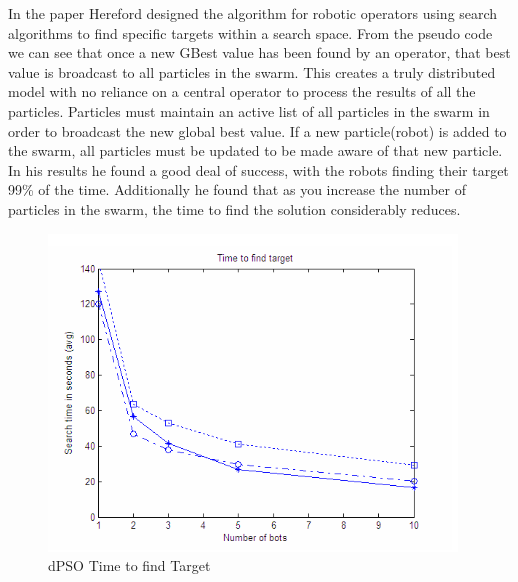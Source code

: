 \documentclass[oneside,12pt]{book}
\begin{document}
In the paper Hereford designed the algorithm for robotic operators using search algorithms to find specific targets within a search space. From the pseudo code we can see that once a new GBest value has been found by an operator, that best value is broadcast to all particles in the swarm. 
This creates a truly distributed model with no reliance on a central operator to process the results of all the particles. Particles must maintain an active list of all particles in the swarm in order to broadcast the new global best value. If a new particle(robot) is added to the swarm, all particles must be updated to be made aware of that new particle. 
In his results he found a good deal of success, with the robots finding their target 99\% of the time. Additionally he found that as you increase the number of particles in the swarm, the time to find the solution considerably reduces. 
\begin{figure}[H]
    \centering
    \includegraphics[scale=0.9]{Images/HerefordResults.png}
    \caption{dPSO Time to find Target \protect\cite{hereford_2006} }
    \label{fig:dPSO Time to find Target}
\end{figure}
\end{document}
